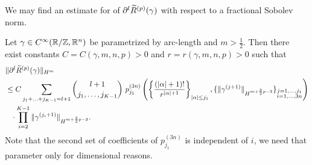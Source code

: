 We may find an estimate for of $\partial^l \widetilde R^{(p)}(\gamma)$ with respect to a fractional Sobolev norm.
\begin{lemma}
    \label{lemma:estimateRemainder}
    Let $\gamma \in C^\infty(\mathbb{R}/\mathbb{Z},\mathbb{R}^n)$ be parametrized by arc-length and $m > \tfrac 12$.
    Then there exist constants $C=C(\gamma,m,n,p)>0$ and
     $r= r(\gamma,m,n,p)>0$  such that
    \begin{align*}
    	& \norm[H^m]{\partial^l \Rpt(\gamma)} \\
    	& \leq C \sum_{j_1 + \ldots + j_{K-1} = l+1} \binom{l+1}{j_1, \ldots, j_{K-1}} \ p^{(3n)}_{j_1} \left( \left\{\frac{(|\alpha|+1)!}{r^{|\alpha|+1}} \right\}_{|\alpha|\leq j_1}, \{ \| \gamma^{(j+1)} \|_{H^{m+ \frac 32 p -3}}\}_{\substack{j =1, \ldots, j_1\\ i = 1, \ldots, 3n}} \right) \\
    	& \phantom{\le} \cdot \prod_{i=2}^{K-1} {\|\gamma^{(j_i+1)}\|_{H^{m+ \frac 32 p -3}}}.
    \end{align*}
    Note that the second set of coefficients of $p^{(3n)}_{j_1}$ is independent of $i$, we need that parameter only for dimensional reasons.
\end{lemma}


